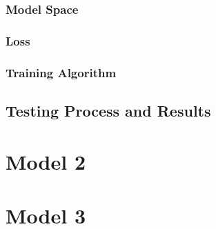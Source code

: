 \documentclass[11pt]{article}
\begin{document}
\subsubsection{Model Space}

\subsubsection{Loss}

\subsubsection{Training Algorithm}

\subsection{Testing Process and Results}

\section{Model 2}






\section{Model 3}





\end{document}
